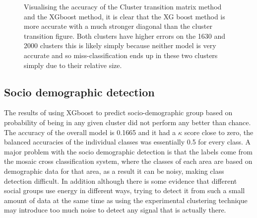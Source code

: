 \begin{figure}[ht]
\centering
{}

\caption[Node Cluster Forecasting]{Visualising the accuracy of the Cluster transition matrix method and the XGboost method, it is clear that the XG boost method is more accurate with a much stronger diagonal than the cluster transition figure. Both clusters have higher errors on the 1630 and 2000 clusters this is likely simply because neither model is very accurate and so miss-classification ends up in these two clusters simply due to their relative size.}
\label{fig:NodeClustFore}
\end{figure}

\subsection{Socio demographic detection}

The results of using XGboost to predict socio-demographic group based on probability of being in any given cluster did not perform any better than chance.  The accuracy of the overall model is 0.1665 and it had a $\kappa$ score close to zero,  the balanced accuracies of the individual classes was essentially 0.5 for every class. A major problem with the socio demographic detection is that the labels come from the mosaic cross classification system, where the classes of each area are based on demographic data for that area, as a result it can be noisy, making class detection difficult. In addition although there is some evidence that different social groups use energy in different ways, trying to detect it from such a small amount of data at the same time as using the experimental clustering technique may introduce too much noise to detect any signal that is actually there.

